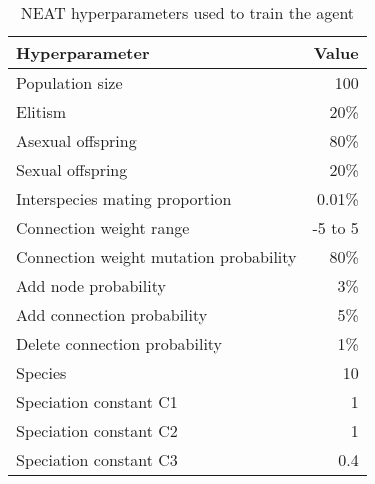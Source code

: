 
\begin{table}
\begin{center}
	\begin{tabular}{| l | r |}
		\hline
	
		\textbf{Hyperparameter} & \textbf{Value} \\ \hline
		Population size & 100 \\ \hline
		Elitism & 20\% \\ \hline
		Asexual offspring & 80\% \\ \hline
		Sexual offspring & 20\% \\ \hline
		Interspecies mating proportion & 0.01\% \\ \hline
		Connection weight range & -5 to 5 \\ \hline
		Connection weight mutation probability & 80\% \\ \hline
		Add node probability & 3\% \\ \hline
		Add connection probability & 5\% \\ \hline
		Delete connection probability & 1\% \\ \hline
		Species & 10 \\ \hline
		Speciation constant C1 & 1 \\ \hline
		Speciation constant C2 & 1 \\ \hline
		Speciation constant C3 & 0.4 \\ \hline
		
	\end{tabular}
\end{center}
\caption[NEAT hyperparameters]{NEAT hyperparameters used to train the agent}
\label{tab:neat-hyperparams}
\end{table}
